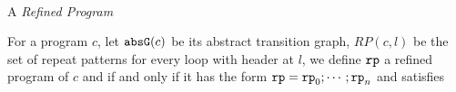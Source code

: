 \begin{enumerate}
\\
A \emph{Refined Program}
\begin{defn}
  \label{def:refined-prog}
  For a program $c$, let $\mathtt{abs}{\mathtt{G}}(c)$ be its abstract transition graph, $RP(c, l)$ be the set of repeat patterns 
  for every loop with header at $l$,
  we define $\mathtt{rp}$ a refined program of $c$ and if and only if it has the form $\mathtt{rp} = \mathtt{rp}_0; \cdots; \mathtt{rp}_n$
  and satisfies

\end{defn}
\end{enumerate}
